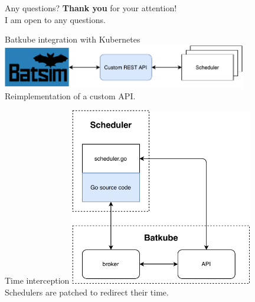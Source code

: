 \documentclass[12pt, aspectratio=43]{beamer}
\begin{document}
\begin{frame}{Any questions?}
	\centering
	\textbf{Thank you} for your attention!\\

	I am open to any questions.
\end{frame}

\appendix
\begin{frame}{Batkube integration with Kubernetes}
	\centering
	\includegraphics[width=0.8\textwidth]{../imgs/custom-api.pdf}\\
	\small{Reimplementation of a custom API.}
\end{frame}

\begin{frame}{Time interception}
	\centering
	\includegraphics[width=0.6\textwidth]{../imgs/synchro-go-sources.pdf}\\
	\small{Schedulers are patched to redirect their time.}
\end{frame}
\end{document}

